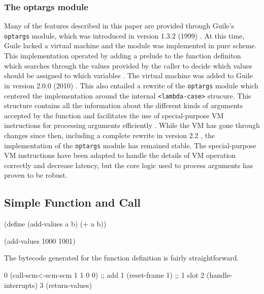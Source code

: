 \subsubsection{The optargs module}
Many of the features described in this paper are provided through Guile's \texttt{optargs}
module, which was introduced in version 1.3.2 (1999)
\parencite[][Section 9.1.4 "A Timeline of Selected Guile Releases"]{guile-manual}
\parencite[][NEWS lines 11451-11525]{guile-source}. 
At this time, Guile lacked a virtual machine and the module was implemented in pure
scheme.
This implementation operated by adding a prelude to the function definiton which searches
through the values provided by the caller to decide which values should be assigned to
which variables
\parencite[][ice-9/optargs.scm]{guile-1.3.2}.
The virtual machine was added to Guile in version 2.0.0 (2010)
\parencite[][Section 9.1.4 "A Timeline of Selected Guile Releases"]{guile-manual}
\parencite[][NEWS lines 5068-5071]{guile-source}.
This also entailed a rewrite of the \texttt{optargs} module which centered the
implementation around the internal \texttt{<lambda-case>} strucure.
This structure contains all the information about the different kinds of arguments
accepted by the function and facilitates the use of special-purpose VM instructions for
processing arguments efficiently
\parencite[][2009-10 lines 6428-6453]{guile-devel-archive}.
While the VM has gone through changes since then, including a complete rewrite in version
2.2
\parencite[][Section 9.1.4 "A Timeline of Selected Guile Releases"]{guile-manual},
the implementation of the \texttt{optargs} module has remained stable.
The special-purpose VM instructions have been adapted to handle the details of VM
operation correctly and decrease latency, but the core logic used to process arguments has
proven to be robust.

\subsection{Simple Function and Call}

\begin{pygmented}[lang=lisp]
(define (add-values a b)
  (+ a b))

(add-values 1000 1001)
\end{pygmented}

The bytecode generated for the function definition is fairly straightforward.

\begin{pygmented}[lang=lisp]
0 (call-scm<-scm-scm 1 1 0 0)     ;; add
1 (reset-frame 1)                 ;; 1 slot
2 (handle-interrupts)
3 (return-values)
\end{pygmented}

